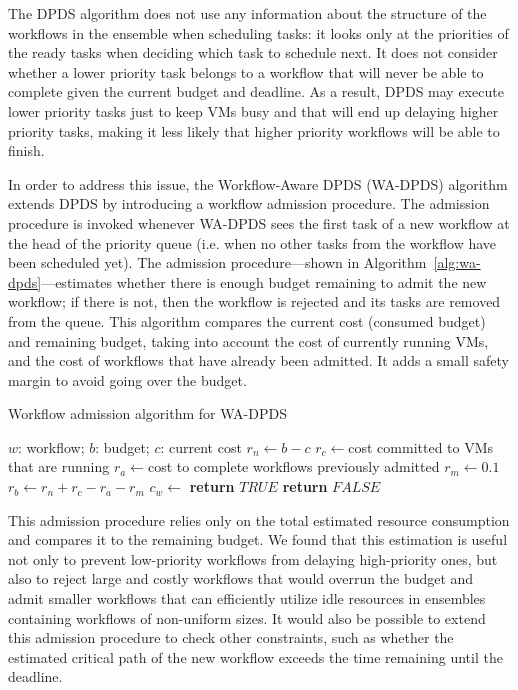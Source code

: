 \documentclass{sig-alternate}
\begin{document}
The DPDS algorithm does not use any information about the structure of the workflows
in the ensemble when scheduling tasks: it looks only at the priorities of the ready 
tasks when deciding which task to schedule next. It does not consider whether a lower 
priority task belongs to a workflow that will never be able to complete given the 
current budget and deadline. As a result, DPDS may execute lower priority tasks just 
to keep VMs busy and that will end up delaying higher priority tasks, making it less likely
that higher priority workflows will be able to finish.

In order to address this issue, the Workflow-Aware DPDS (WA-DPDS) algorithm extends 
DPDS by introducing a workflow admission procedure. The admission procedure is
invoked whenever WA-DPDS sees the first task of a new workflow at the head of the 
priority queue (i.e. when no other tasks from the workflow have been scheduled yet). 
The admission procedure---shown in Algorithm~\ref{alg:wa-dpds}---estimates whether there is 
enough budget remaining to admit the new workflow; if there is not, then the 
workflow is rejected and its tasks are removed from the queue. This algorithm 
compares the current cost (consumed budget) and remaining budget, taking
into account the cost of currently running VMs, and the cost of workflows 
that have already been admitted. It adds a small safety margin to  avoid going over
the budget.

\begin{algorithm}
\caption{Workflow admission algorithm for WA-DPDS}
\label{alg:wa-dpds}
\begin{algorithmic}[1]
\Require $w$: workflow; $b$: budget; $c$: current cost
    \State $r_n\gets b-c$ 
    \State $r_c\gets $cost committed to VMs that are running
    \State $r_a\gets $cost to complete workflows previously admitted
	\State $r_m\gets 0.1$ 
	\State $r_b\gets r_n+r_c-r_a-r_m$ 
	\State $c_w\gets$ 
    	\State \textbf{return} $TRUE$
    \Else
    	\State \textbf{return} $FALSE$
	\EndIf    	 
\EndProcedure
\end{algorithmic} 
\end{algorithm}


This admission procedure relies only on the total estimated resource consumption and
compares it to the remaining budget. We found that this estimation is useful not
only to prevent low-priority workflows from delaying high-priority ones, but
also to reject large and costly workflows that would overrun the budget and
admit smaller workflows that can efficiently utilize idle resources in ensembles 
containing workflows of non-uniform sizes. It would also be possible to extend this 
admission procedure to check other constraints, such as whether the estimated 
critical path of the new workflow exceeds the time remaining until the deadline.
\end{document}
